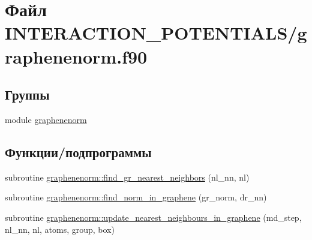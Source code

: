 \hypertarget{graphenenorm_8f90}{}\section{Файл I\+N\+T\+E\+R\+A\+C\+T\+I\+O\+N\+\_\+\+P\+O\+T\+E\+N\+T\+I\+A\+L\+S/graphenenorm.f90}
\label{graphenenorm_8f90}
\subsection*{Группы}
\begin{DoxyCompactItemize}
\item 
module \mbox{\hyperlink{namespacegraphenenorm}{graphenenorm}}
\end{DoxyCompactItemize}
\subsection*{Функции/подпрограммы}
\begin{DoxyCompactItemize}
\item 
subroutine \mbox{\hyperlink{namespacegraphenenorm_afb5708c33c6fe9d316e999710adeeef5}{graphenenorm\+::find\+\_\+gr\+\_\+nearest\+\_\+neighbors}} (nl\+\_\+nn, nl)
\item 
subroutine \mbox{\hyperlink{namespacegraphenenorm_a6005cfed33b7112df95442616a990b5b}{graphenenorm\+::find\+\_\+norm\+\_\+in\+\_\+graphene}} (gr\+\_\+norm, dr\+\_\+nn)
\item 
subroutine \mbox{\hyperlink{namespacegraphenenorm_a16d22fddd4c9f90cdf1236130515fd24}{graphenenorm\+::update\+\_\+nearest\+\_\+neighbours\+\_\+in\+\_\+graphene}} (md\+\_\+step, nl\+\_\+nn, nl, atoms, group, box)
\end{DoxyCompactItemize}
